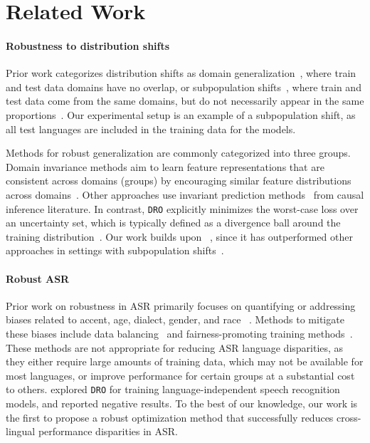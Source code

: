 \section{Related Work}
\paragraph{Robustness to distribution shifts}
Prior work categorizes distribution shifts as domain generalization~\citep{quinonero2008dataset, santurkar2020breedsbenchmarkssubpopulationshift, hendrycks2021many}, where train and test data domains have no overlap, or subpopulation shifts~\citep{dixon2018measuring, oren-etal-2019-distributionally, groupdro20}, where train and test data come from the same domains, but do not necessarily appear in the same proportions~\citep{koh2021wilds}. Our experimental setup is an example of a subpopulation shift, as all test languages are included in the training data for the models.

Methods for robust generalization are commonly categorized into three groups. Domain invariance methods aim to learn feature representations that are consistent across domains (groups) by encouraging similar feature distributions across domains~\citep{tzeng2014deep, long2015learning, ganin2016domain, coral16}. Other approaches use invariant prediction methods~\citep{meinshausen2014maximin, peters2016causal, arjovsky2019invariant, rothenhausler2021anchor} from causal inference literature. In contrast, \texttt{DRO} explicitly minimizes the worst-case loss over an uncertainty set, which is typically defined as a divergence ball around the training distribution~\citep{namkoong2016stochastic, mohajerin2018data, bertsimas2018data, duchi2019variance, oren-etal-2019-distributionally, groupdro20}. Our work builds upon \orig{}~\citep{groupdro20}, since it has outperformed other approaches in settings with subpopulation shifts~\citep{koh2021wilds}.

\paragraph{Robust ASR}
Prior work on robustness in ASR primarily focuses on quantifying or addressing biases related to accent, age, dialect, gender, and race ~\citep{tatman-2017-gender, koenecke2020, ngueajio2022hey, markl, martin2023, feng2024101567, harris-etal-2024-modeling}.
Methods to mitigate these biases include data balancing~\citep{dheram2022toward} and fairness-promoting training methods~\citep{sari, zhang2022mitigating, veliche}.
These methods are not appropriate for reducing ASR language disparities, as they either require large amounts of training data, which may not be available for most languages, or improve performance for certain groups at a substantial cost to others.
\citet{gao2022domain} explored \texttt{DRO} for training language-independent speech recognition models, and reported  negative results. To the best of our knowledge, our work is the first to propose a robust optimization method that successfully reduces cross-lingual performance disparities in ASR.